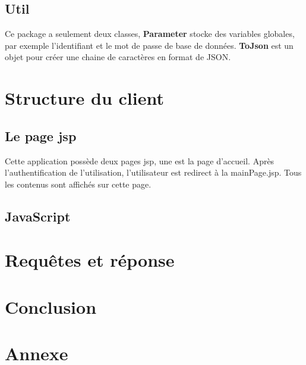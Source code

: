 \documentclass[14px]{article}
\begin{document}
\subsection{Util}
Ce package a seulement deux classes, \textbf{Parameter} stocke des variables globales, par exemple l'identifiant et le mot de passe de base de données. \textbf{ToJson} est un objet pour créer une chaine de caractères en format de JSON.

\section{Structure du client}
\subsection{Le page jsp}
Cette application possède deux pages jsp, une est la page d'accueil. Après l'authentification de l'utilisation, l'utilisateur est redirect à la mainPage.jsp. Tous les contenus sont affichés sur cette page.
\subsection{JavaScript}




\section{Requêtes et réponse}

\section{Conclusion}


\section{Annexe}
\begin{figure1}
\end{figure1}
\end{document}

